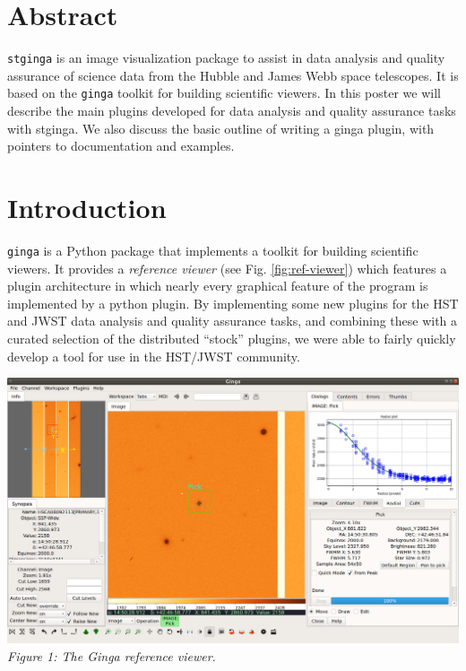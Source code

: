 \documentclass[]{article}
\begin{document}
\medskip
\begin{multicols}{3}

\section*{Abstract}
{\tt stginga}\cite{stginga} is an image visualization package to assist
in data analysis and quality assurance of science data from the Hubble
and James Webb space telescopes.  It is based on the
{\tt ginga}\cite{ginga} toolkit for building scientific viewers.
In this poster we will describe the main plugins developed for data
analysis and quality assurance tasks with stginga.  We also discuss the
basic outline of writing a ginga plugin, with pointers to documentation
and examples.

\section*{Introduction}
{\tt ginga}\cite{Jeschke15A} is a Python package that
implements a toolkit for building scientific viewers.  It provides
a \emph{reference viewer} (see Fig. \ref{fig:ref-viewer}) which features
a plugin architecture in which nearly every graphical feature of the
program is implemented by a python plugin. 
By implementing some new plugins for the HST and JWST data analysis and
quality assurance tasks, and combining these with a curated selection of
the distributed ``stock'' plugins, we were able to fairly quickly
develop a tool for use in the HST/JWST community.  

\para
\begin{center}
\includegraphics[width=8in]{ref_viewer}
\label{fig:ref-viewer}
\vspace*{0.4em}
{\small\em Figure 1: The Ginga reference viewer.} 
\end{center}


\end{multicols}
\end{document}
